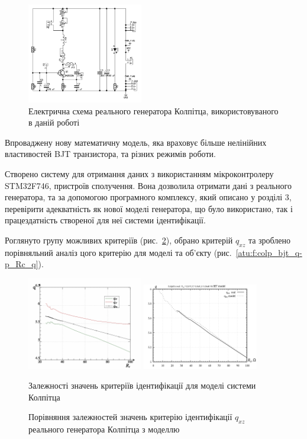 \documentclass[a4paper,13pt]{atuaref}
\begin{document}
\begin{figure}[htb!]
\centerline{\includegraphics[width=0.45\textwidth]{p6/p/colp_schem_real.png} }
\caption{Електрична схема реального генератора Колпітца, використовуваного в даній роботі}
\label{atu:f:colp_schem_real}
\end{figure}

Впроваджену нову математичну модель,
яка враховує більше нелінійних властивостей
BJT транзистора, та різних режимів роботи.


Створено систему для отримання даних з використанням мікроконтролеру STM32F746, пристроїв сполучення.
Вона дозволила отримати дані з реального
генератора, та за допомогою програмного комплексу,
який описано у розділі 3, перевірити адекватність як
нової моделі генератора, що було використано,
так і працездатність створеної для неї системи ідентифікації.

Роглянуто групу можливих критеріїв (рис.~\ref{atu:f:colp_q_cml}),
обрано критерій $q_{xz}$
та зроблено порівняльний аналіз цого критерію
для моделі та об'єкту (рис.~\ref{atu:f:colp_bjt_q-p_Rc_q}).

\begin{figure}[htb!]
  \includegraphics[width=0.45\textwidth]{p6/p/colp_read_q-p_Rc_q.png}
  \hfill
  \includegraphics[width=0.45\textwidth]{p6/p/colp_q_cml.png}
\\
\parbox[t]{0.45\textwidth}{
  \caption{Залежності значень критеріїв ідентифікації для моделі системи Колпітца}
  \label{atu:f:colp_bjt_q-p_Rc_q}
}
\hfill
\parbox[t]{0.45\textwidth}{
  \caption{Порівняння залежностей значень критерію ідентифікації $q_{xz}$ реального генератора Колпітца з моделлю}
  \label{atu:f:colp_q_cml}
}
\end{figure}
\end{document}

